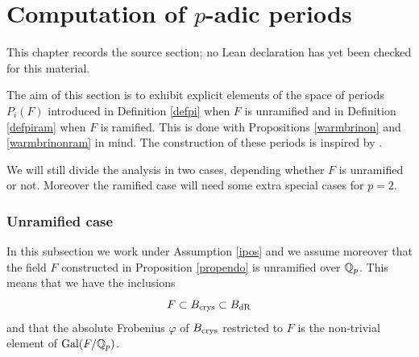 \chapter{Computation of $p$-adic periods}
\label{standard-conjectures-abelian-fourfolds-chapter-12}

\begin{remark}
\label{standard-conjectures-abelian-fourfolds-chapter-12-source}
This chapter records the source section; no Lean declaration has yet been checked for this material.
\notready
\end{remark}

\label{computation}
The aim of this section is to exhibit explicit elements of the space of periods $P_i(F)$ introduced in Definition \ref{defpi} when $F$ is unramified and in Definition \ref{defpiram} when $F$ is ramified. This is done with Propositions  \ref{warmbrinon} and \ref{warmbrinonram} in mind. The construction of these periods is inspired by \cite[\S 9]{Colmez}.


 We will still divide the analysis in two cases, depending  whether $F$ is unramified or not.  Moreover the ramified case will need some extra special cases for $p=2$.

 \subsection*{Unramified case}

In  this subsection we work under   Assumption  \ref{ipos} and we assume moreover that the field $F$  constructed in  Proposition \ref{propendo} is unramified over $\mathbb{Q}_p$.
This means that we have the inclusions \[F \subset  B_{\textnormal{crys}} \subset B_{\mathrm{dR}}\] and that the absolute Frobenius $\varphi$ of $B_{\textnormal{crys}}$  restricted to $F$ is the  non-trivial element of $\textnormal{Gal}(F/\mathbb{Q}_p)$.


